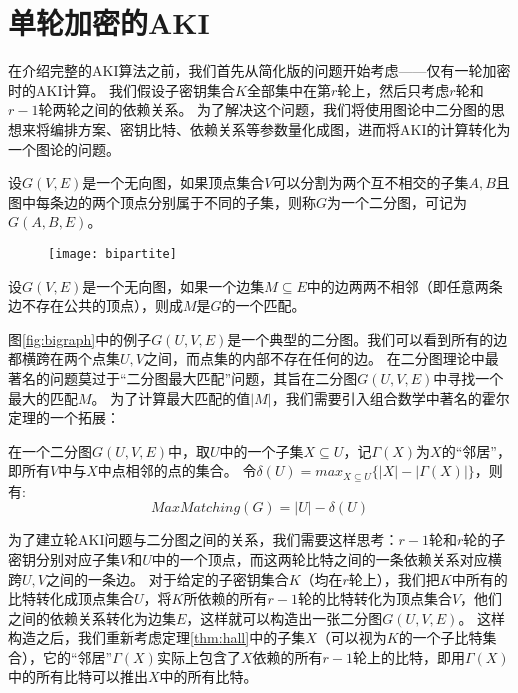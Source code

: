 \section{单轮加密的AKI}
\label{Bigraph}
在介绍完整的AKI算法之前，我们首先从简化版的问题开始考虑——仅有一轮加密时的AKI计算。
我们假设子密钥集合$K$全部集中在第$r$轮上，然后只考虑$r$轮和$r-1$轮两轮之间的依赖关系。
为了解决这个问题，我们将使用图论中二分图的思想来将编排方案、密钥比特、依赖关系等参数量化成图，进而将AKI的计算转化为一个图论的问题。
\begin{defn}[二分图]
    设$G(V,E)$是一个无向图，如果顶点集合$V$可以分割为两个互不相交的子集$A,B$且图中每条边的两个顶点分别属于不同的子集，则称$G$为一个二分图，可记为$G(A,B,E)$。
\end{defn}
\begin{figure}
    \centering
    \texttt{[image: bipartite]}
\end{figure}
\begin{defn}[图的匹配]
    设$G(V,E)$是一个无向图，如果一个边集$M\subseteq E$中的边两两不相邻（即任意两条边不存在公共的顶点），则成$M$是$G$的一个匹配。
\end{defn}
图\ref{fig:bigraph}中的例子$G(U,V,E)$是一个典型的二分图。我们可以看到所有的边都横跨在两个点集$U,V$之间，而点集的内部不存在任何的边。
在二分图理论中最著名的问题莫过于“二分图最大匹配”问题，其旨在二分图$G(U,V,E)$中寻找一个最大的匹配$M$。
为了计算最大匹配的值$|M|$，我们需要引入组合数学中著名的霍尔定理的一个拓展：
\begin{thm}
    在一个二分图$G(U,V,E)$中，取$U$中的一个子集$X\subseteq U$，记$\Gamma(X)$为$X$的“邻居”，即所有$V$中与$X$中点相邻的点的集合。
    令$\delta(U)=max_{X\subseteq U}\{|X|-|\Gamma(X)|\}$，则有:
    $$MaxMatching(G)=|U|-\delta(U)$$
    \label{thm:hall}
\end{thm}
为了建立轮AKI问题与二分图之间的关系，我们需要这样思考：$r-1$轮和$r$轮的子密钥分别对应子集$V$和$U$中的一个顶点，而这两轮比特之间的一条依赖关系对应横跨$U,V$之间的一条边。
对于给定的子密钥集合$K$（均在$r$轮上），我们把$K$中所有的比特转化成顶点集合$U$，将$K$所依赖的所有$r-1$轮的比特转化为顶点集合$V$，他们之间的依赖关系转化为边集$E$，这样就可以构造出一张二分图$G(U,V,E)$。
这样构造之后，我们重新考虑定理\ref{thm:hall}中的子集$X$（可以视为$K$的一个子比特集合），它的“邻居”$\Gamma(X)$实际上包含了$X$依赖的所有$r-1$轮上的比特，即用$\Gamma(X)$中的所有比特可以推出$X$中的所有比特。
